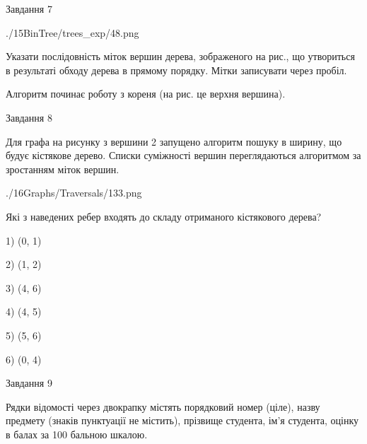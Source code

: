 \documentclass[12pt, ukrainian]{article}
\begin{document}
{\vspace{10mm}\par

\newpage
\begin{minipage}[t]{9.7cm}
               
{\begin{center}Завдання {7}\end{center}}
\vspace{-6mm}

\begin{center}
	{./15BinTree/trees_exp/48.png}
\end{center}
Указати послідовність міток вершин дерева, зображеного на рис., що утвориться в результаті обходу дерева в прямому порядку. Мітки записувати через пробіл.\par Алгоритм починає роботу з кореня (на рис. це верхня вершина).\par

\end{minipage}
\vline \hspace{8mm}
\begin{minipage}[t]{8.0cm}
               
{\begin{center}Завдання {8}\end{center}}
\vspace{-6mm}
Для графа на рисунку з вершини 2 запущено алгоритм пошуку в ширину, що будує кістякове дерево. Списки суміжності вершин переглядаються алгоритмом за зростанням міток вершин.\par
\begin{center}
	{./16Graphs/Traversals/133.png}
\end{center}
\par Які з наведених ребер входять до складу отриманого кістякового дерева?\par
1) (0, 1)\par
2) (1, 2)\par
3) (4, 6)\par
4) (4, 5)\par
5) (5, 6)\par
6) (0, 4)\par
{\vskip 15pt} \par

\end{minipage}

               
{\begin{center}Завдання {9}\end{center}}
\vspace{-6mm}
Рядки відомості через двокрапку містять порядковий номер (ціле), назву предмету (знаків пунктуації не містить), прізвище студента, ім'я студента, оцінку в балах за 100 бальною шкалою.

}
\end{document}
